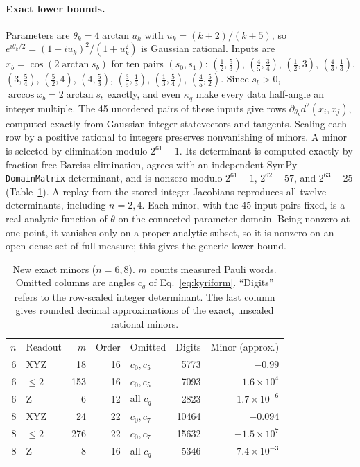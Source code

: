 \paragraph{Exact lower bounds.}
Parameters are $\theta_k=4\arctan u_k$ with $u_k=(k+2)/(k+5)$, so
$e^{i\theta_k/2}=(1+iu_k)^2/(1+u_k^2)$ is Gaussian rational. Inputs
are $x_b=\cos(2\arctan s_b)$ for ten pairs $(s_0,s_1)$:
$(\frac12,\frac53)$, $(\frac45,\frac34)$, $(\frac12,3)$,
$(\frac43,\frac13)$, $(3,\frac54)$, $(\frac52,4)$, $(4,\frac53)$,
$(\frac35,\frac13)$, $(\frac13,\frac54)$, $(\frac45,\frac52)$.
Since $s_b>0$, $\arccos x_b=2\arctan s_b$ exactly, and even
$\kappa_q$ make every data half-angle an integer multiple. The 45
unordered pairs of these inputs give rows
$\partial_{\theta_k}d^2(x_i,x_j)$, computed exactly from
Gaussian-integer statevectors and tangents. Scaling each row by a
positive rational to integers preserves nonvanishing of minors.
A minor is selected by elimination modulo $2^{61}-1$. Its determinant
is computed exactly by fraction-free Bareiss elimination, agrees with
an independent SymPy \texttt{DomainMatrix} determinant, and is nonzero
modulo $2^{61}-1$, $2^{62}-57$, and $2^{63}-25$
(Table~\ref{tab:kyriminors}). A replay from the stored integer
Jacobians reproduces all twelve determinants, including $n=2,4$.
Each minor, with the 45 input pairs fixed, is a real-analytic
function of $\theta$ on the connected parameter domain. Being nonzero
at one point, it vanishes only on a proper analytic subset, so it is
nonzero on an open dense set of full measure; this gives the generic
lower bound.

\begin{table}[b]
\caption{New exact minors ($n=6,8$). $m$ counts measured Pauli words.
Omitted columns are angles $c_q$ of Eq.~\eqref{eq:kyriform}.
``Digits'' refers to the row-scaled integer determinant. The last
column gives rounded decimal approximations of the exact, unscaled
rational minors.}
\label{tab:kyriminors}
\begin{tabular}{rlrrlrr}
\toprule
$n$ & Readout & $m$ & Order & Omitted & Digits & Minor (approx.)\\
6 & XYZ & 18 & 16 & $c_0,c_5$ & 5773 & $-0.99$\\
6 & $\le2$ & 153 & 16 & $c_0,c_5$ & 7093 & $1.6\times10^{4}$\\
6 & Z & 6 & 12 & all $c_q$ & 2823 & $1.7\times10^{-6}$\\
8 & XYZ & 24 & 22 & $c_0,c_7$ & 10464 & $-0.094$\\
8 & $\le2$ & 276 & 22 & $c_0,c_7$ & 15632 & $-1.5\times10^{7}$\\
8 & Z & 8 & 16 & all $c_q$ & 5346 & $-7.4\times10^{-3}$\\
\bottomrule
\end{tabular}
\end{table}

